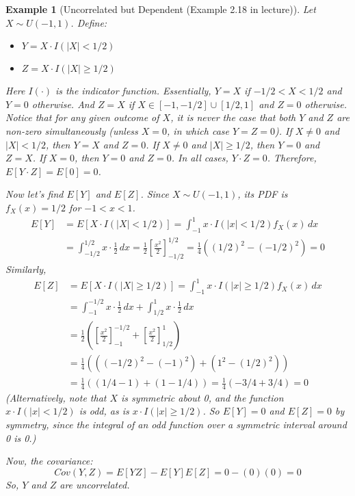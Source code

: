 \documentclass[11pt]{article}
\newtheorem{example}[theorem]{Example}
\begin{document}
\begin{example}[Uncorrelated but Dependent (Example 2.18 in lecture)]
\label{ex:uncorrelated_dependent}
Let $X \sim U(-1,1)$. Define:
\begin{itemize}
    \item $Y = X \cdot I(|X| < 1/2)$
    \item $Z = X \cdot I(|X| \ge 1/2)$
\end{itemize}
Here $I(\cdot)$ is the indicator function.
Essentially, $Y=X$ if $-1/2 < X < 1/2$ and $Y=0$ otherwise.
And $Z=X$ if $X \in [-1, -1/2] \cup [1/2, 1]$ and $Z=0$ otherwise.
Notice that for any given outcome of $X$, it is never the case that both $Y$ and $Z$ are non-zero simultaneously (unless $X=0$, in which case $Y=Z=0$).
If $X \neq 0$ and $|X| < 1/2$, then $Y=X$ and $Z=0$.
If $X \neq 0$ and $|X| \ge 1/2$, then $Y=0$ and $Z=X$.
If $X=0$, then $Y=0$ and $Z=0$.
In all cases, $Y \cdot Z = 0$.
Therefore, $E[Y \cdot Z] = E[0] = 0$.

Now let's find $E[Y]$ and $E[Z]$.
Since $X \sim U(-1,1)$, its PDF is $f_X(x) = 1/2$ for $-1 < x < 1$.
\begin{align*}
E[Y] &= E[X \cdot I(|X| < 1/2)] = \int_{-1}^1 x \cdot I(|x| < 1/2) f_X(x) \, dx \\
     &= \int_{-1/2}^{1/2} x \cdot \frac{1}{2} \, dx = \frac{1}{2} \left[\frac{x^2}{2}\right]_{-1/2}^{1/2} = \frac{1}{4} \left( (1/2)^2 - (-1/2)^2 \right) = 0
\end{align*}
Similarly,
\begin{align*}
E[Z] &= E[X \cdot I(|X| \ge 1/2)] = \int_{-1}^1 x \cdot I(|x| \ge 1/2) f_X(x) \, dx \\
     &= \int_{-1}^{-1/2} x \cdot \frac{1}{2} \, dx + \int_{1/2}^{1} x \cdot \frac{1}{2} \, dx \\
     &= \frac{1}{2} \left( \left[\frac{x^2}{2}\right]_{-1}^{-1/2} + \left[\frac{x^2}{2}\right]_{1/2}^{1} \right) \\
     &= \frac{1}{4} \left( ((-1/2)^2 - (-1)^2) + (1^2 - (1/2)^2) \right) \\
     &= \frac{1}{4} \left( (1/4 - 1) + (1 - 1/4) \right) = \frac{1}{4} (-3/4 + 3/4) = 0
\end{align*}
(Alternatively, note that $X$ is symmetric about 0, and the function $x \cdot I(|x|<1/2)$ is odd, as is $x \cdot I(|x| \ge 1/2)$. So $E[Y]=0$ and $E[Z]=0$ by symmetry, since the integral of an odd function over a symmetric interval around 0 is 0.)

Now, the covariance:
\begin{equation}
Cov(Y,Z) = E[YZ] - E[Y]E[Z] = 0 - (0)(0) = 0
\end{equation}
So, $Y$ and $Z$ are uncorrelated.


\end{example}
\end{document}
